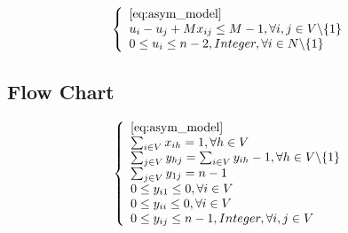 \begin{equation}
\left\{ \begin{array}{l}
 \ref{eq:asym_model}\\
u_i -u_j +M x_{ij} \le M - 1, \forall i,j \in V \backslash \{1\}\\
0 \le u_{i} \le n-2, Integer, \forall i \in N \backslash \{1\}
\end{array}
\right.
\end{equation}

\subsection{Flow Chart}

\begin{equation}
\left\{ \begin{array}{l}
\ref{eq:asym_model}\\
\sum_{i\in V} x_{ih} = 1, \forall h \in V \\
\sum_{j\in V} y_{hj} = \sum_{i \in V}y_{ih} - 1, \forall h \in V \backslash \{1\} \\
\sum_{j\in V} y_{1j} = n-1 \\
0 \le y_{i1} \le 0, \forall i \in V \\
0 \le y_{ii} \le 0, \forall i \in V \\
0 \le y_{ij} \le n-1, Integer, \forall i,j \in V 
\end{array}
\right.
\end{equation}